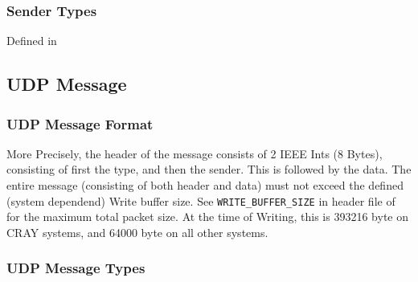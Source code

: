 \subsubsection{Sender Types}

Defined in 

\begin{messagetypes}
\end{messagetypes}

\subsection{UDP Message}

\subsubsection{UDP Message Format}

\begin{messagedesc}
\end{messagedesc}

More Precisely, the header of the message consists of 2 IEEE Ints (8 Bytes), consisting of first the type, and then the sender. This is followed by the data. The entire message (consisting of both header and data) must not exceed the defined (system dependend) Write buffer size. See \lstinline|WRITE_BUFFER_SIZE| in header file of  for the maximum total packet size. At the time of Writing, this is 393216 byte on CRAY systems, and 64000 byte on all other systems.

\subsubsection{UDP Message Types}

